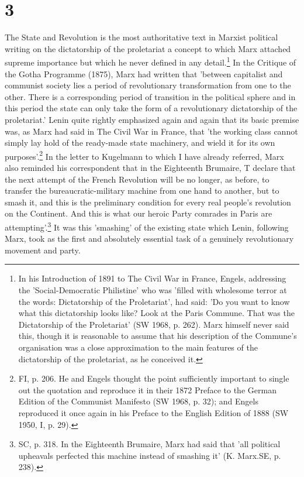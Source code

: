 \section*{3}
The State and Revolution is the most authoritative text in Marxist political writing on the dictatorship of the proletariat a concept to which Marx attached supreme importance but which he never defined in any detail.\footnote{In his Introduction of 1891 to The Civil War in France, Engels, addressing the 'Social-Democratic Philistine' who was 'filled with wholesome terror at the words: Dictatorship of the Proletariat', had said: 'Do you want to know what this dictatorship looks like? Look at the Paris Commune. That was the Dictatorship of the Proletariat' (SW 1968, p. 262). Marx himself never said this, though it is reasonable to assume that his description of the Commune's organisation was a close approximation to the main features of the dictatorship of the proletariat, as he conceived it.} In the Critique of the Gotha Programme (1875), Marx had written that 'between capitalist and communist society lies a period of revolutionary transformation from one to the other. There is a corresponding period of transition in the political sphere and in this period the state can only take the form of a revolutionary dictatorship of the proletariat.' Lenin quite rightly emphasized again and again that its basic premise was, as Marx had said in The Civil War in France, that 'the working class cannot simply lay hold of the ready-made state machinery, and wield it for its own purposes'.\footnote{FI, p. 206. He and Engels thought the point sufficiently important to single out the quotation and reproduce it in their 1872 Preface to the German Edition of the Communist Manifesto (SW 1968, p. 32); and Engels reproduced it once again in his Preface to the English Edition of 1888 (SW 1950, I, p. 29).} In the letter to Kugelmann to which I have already referred, Marx also reminded his correspondent that in the Eighteenth Brumaire, T declare that the next attempt of the French Revolution will be no longer, as before, to transfer the bureaucratic\hyp{}military machine from one hand to another, but to smash it, and this is the preliminary condition for every real people's revolution on the Continent. And this is what our heroic Party comrades in Paris are attempting'.\footnote{SC, p. 318. In the Eighteenth Brumaire, Marx had said that 'all political upheavals perfected this machine instead of smashing it' (K. Marx.SE, p. 238).} It was this 'smashing' of the existing state which Lenin, following Marx, took as the first and absolutely essential task of a genuinely revolutionary movement and party.

